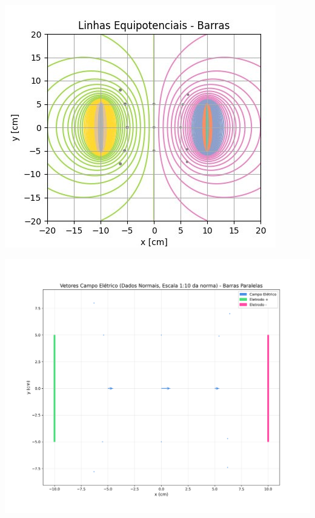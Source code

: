 \documentclass[column,brazilian,12pt,a4paper,final]{article}
\begin{document}
    \vskip 0.5cm %
    
    \begin{minipage}{0.48\textwidth}
        \centering
        \includegraphics[width=\linewidth]{EP2.jpg}
        \label{fig:imagem3}
    \end{minipage} \hfill
    \begin{minipage}{0.48\textwidth}
        \centering
        \includegraphics[width=\linewidth]{Campo PlacasN.png}
        \label{fig:imagem4}
    \end{minipage}
    
\end{document}
